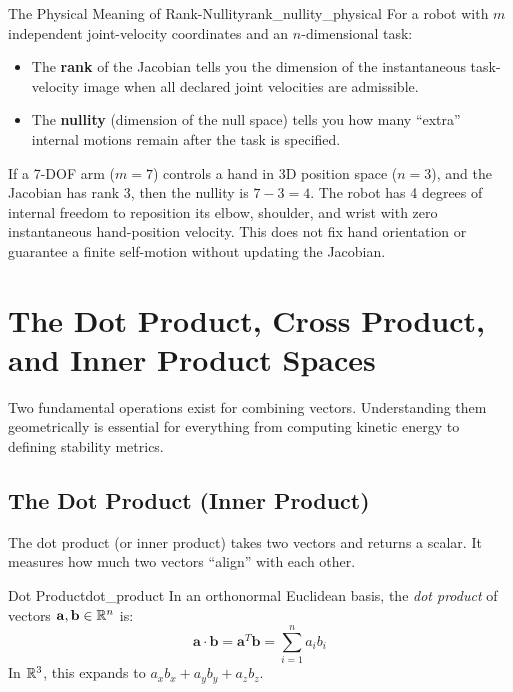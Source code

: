 \begin{laymansbox}{The Physical Meaning of Rank-Nullity}{rank_nullity_physical}
For a robot with $m$ independent joint-velocity coordinates and an $n$-dimensional task:
\begin{itemize}
    \item The \textbf{rank} of the Jacobian tells you the dimension of the instantaneous task-velocity image when all declared joint velocities are admissible.
    \item The \textbf{nullity} (dimension of the null space) tells you how many ``extra'' internal motions remain after the task is specified.
\end{itemize}
If a 7-DOF arm ($m = 7$) controls a hand in 3D position space ($n = 3$), and the Jacobian has rank 3, then the nullity is $7 - 3 = 4$. The robot has 4 degrees of internal freedom to reposition its elbow, shoulder, and wrist with zero instantaneous hand-position velocity. This does not fix hand orientation or guarantee a finite self-motion without updating the Jacobian.
\end{laymansbox}

\section{The Dot Product, Cross Product, and Inner Product Spaces}
\label{sec:dot_cross}

Two fundamental operations exist for combining vectors. Understanding them geometrically is essential for everything from computing kinetic energy to defining stability metrics.

\subsection{The Dot Product (Inner Product)}
\label{subsec:dot_product}

The dot product (or inner product) takes two vectors and returns a scalar. It measures how much two vectors ``align'' with each other.

\begin{definition}{Dot Product}{dot_product}
In an orthonormal Euclidean basis, the \emph{dot product} of vectors $\mathbf{a}, \mathbf{b} \in \mathbb{R}^n$ is:
\begin{equation}
   \mathbf{a} \cdot \mathbf{b} = \mathbf{a}^T \mathbf{b} = \sum_{i=1}^n a_i b_i
\end{equation}
In $\mathbb{R}^3$, this expands to $a_x b_x + a_y b_y + a_z b_z$.
\end{definition}

